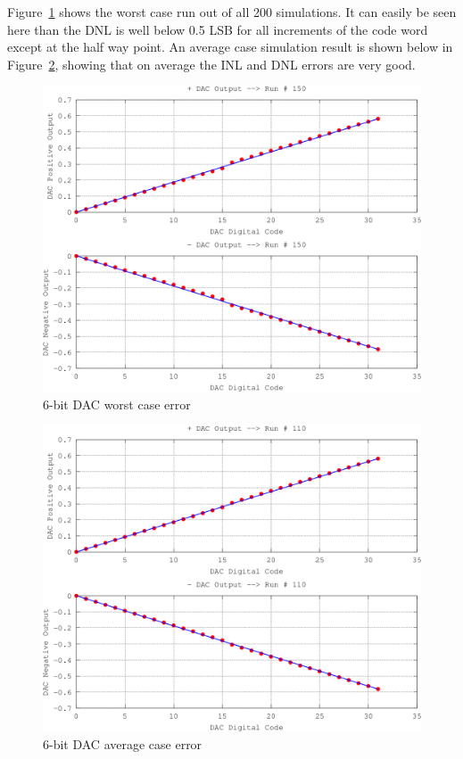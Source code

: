 \documentclass[12pt,oneside,final]{siuethesis}
\theoremstyle{definition}
\begin{document}
\par Figure~\ref{fig:dac-worst} shows the worst case run out of all 200 simulations. It can easily be seen here than the DNL is well below 0.5 LSB for all increments of the code word except at the half way point. An average case simulation result is shown below in Figure~\ref{fig:dac-average}, showing that on average the INL and DNL errors are very good.
\begin{figure}[htbp!]
 \centering
 \includegraphics[scale=.3]{./ch4_figures/dnl_worst.png}
 \caption{6-bit DAC worst case error}
 \label{fig:dac-worst}
\end{figure} 

\begin{figure}[htbp!]
 \centering
 \includegraphics[scale=.3]{./ch4_figures/dac_average.png}
 \caption{6-bit DAC average case error}
 \label{fig:dac-average}
\end{figure} 
\end{document}
